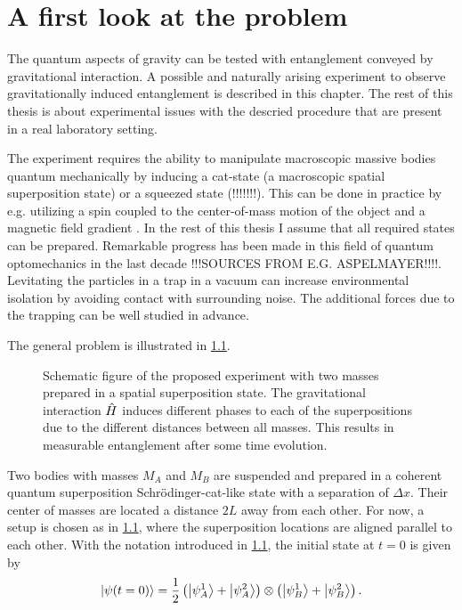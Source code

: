 \chapter{A first look at the problem}\label{cha:first-look}

The quantum aspects of gravity can be tested with entanglement conveyed by gravitational interaction. A possible and naturally arising experiment to observe gravitationally induced entanglement is described in this chapter.
The rest of this thesis is about experimental issues with the descried procedure that are present in a real laboratory setting.

The experiment requires the ability to manipulate macroscopic massive bodies quantum mechanically by inducing a cat-state (a macroscopic spatial superposition state) or a squeezed state (!!!!!!!). 
This can be done in practice by e.g. utilizing a spin coupled to the center-of-mass motion of the object and a magnetic field gradient \cite{Bose_2017}. In the rest of this thesis I assume that all required states can be prepared.
Remarkable progress has been made in this field of quantum optomechanics in the last decade !!!SOURCES FROM E.G. ASPELMAYER!!!!.
Levitating the particles in a trap in a vacuum can increase environmental isolation by avoiding contact with surrounding noise. The additional forces due to the trapping can be well studied in advance.

The general problem is illustrated in \cref{fig:2:simple-problem}.
\begin{figure}[!htbp]
  \centering
  \def\svgwidth{\textwidth}
  
  \caption{Schematic figure of the proposed experiment with two masses prepared in a spatial superposition state. The gravitational interaction $\hat{H}$ induces different phases to each of the superpositions due to the different distances between all masses. This results in measurable entanglement after some time evolution.}
  \label{fig:2:simple-problem}
\end{figure}
Two bodies with masses $M_A$ and $M_B$ are suspended and prepared in a coherent quantum superposition Schrödinger-cat-like state with a separation of $\Delta x$.
Their center of masses are located a distance $2L$ away from each other.
For now, a setup is chosen as in \cref{fig:2:simple-problem}, where the superposition locations are aligned parallel to each other.
With the notation introduced in \cref{fig:2:simple-problem}, the initial state at $t=0$ is given by
\begin{equation}\label{eq:2:initial-state}
  \ket{\psi(t=0)} = \frac{1}{2}\left( \ket{\psi_A^1} + \ket{\psi_A^2} \right) \otimes \left( \ket{\psi_B^1} + \ket{\psi_B^2} \right) .
\end{equation}



